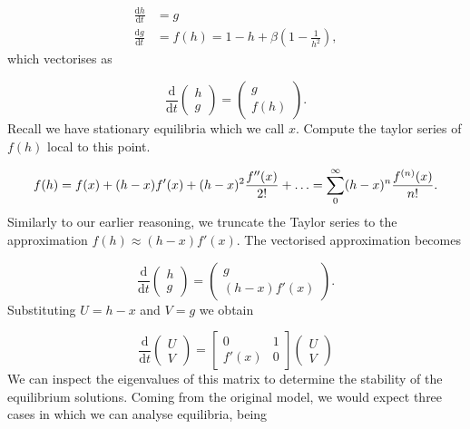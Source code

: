 \documentclass{article}
\begin{document}
\begin{equation}
    \begin{aligned}
        \frac{\mathrm{d}h}{\mathrm{d}t} &= g \\
        \frac{\mathrm{d}g}{\mathrm{d}t} &= f(h) = 1-h +\beta\left(1-\frac{1}{h^2}\right),
    \end{aligned}
\end{equation}
which vectorises as

\begin{equation}
    \frac{\mathrm{d}}{\mathrm{d}t} \begin{pmatrix}
        h \\
        g
    \end{pmatrix} = \begin{pmatrix}
        g \\
        f(h)
    \end{pmatrix}.
\end{equation}
Recall we have stationary equilibria which we call \(x\). Compute the taylor series of \(f(h)\) local to this point.

\begin{equation}
    f(h) = f(x) + (h-x)f'(x) + (h-x)^2\frac{f''(x)}{2!} + \mathellipsis =\sum_{0}^{\infty} (h-x)^n\frac{f^{(n)}(x)}{n!}.
\end{equation}
Similarly to our earlier reasoning, we truncate the Taylor series to the approximation $f(h) \approx (h-x)f'(x)$.
The vectorised approximation becomes

\begin{equation}
    \frac{\mathrm{d}}{\mathrm{d}t}\begin{pmatrix}
        h \\
        g
    \end{pmatrix} = \begin{pmatrix}
        g \\
        (h-x)f'(x)
    \end{pmatrix}.
\end{equation}
Substituting \(U = h-x\) and \(V = g\) we obtain

\begin{equation}
    \frac{\mathrm{d}}{\mathrm{d}t} \begin{pmatrix}
        U \\
        V
    \end{pmatrix} = \begin{bmatrix}
        0 & 1 \\
        f'(x) & 0
    \end{bmatrix} \begin{pmatrix}
        U \\
        V
    \end{pmatrix} 
\end{equation}
We can inspect the eigenvalues of this matrix to determine the stability of the equilibrium solutions. %
Coming from the original model, we would expect three cases in which we can analyse equilibria, being
\end{document}
